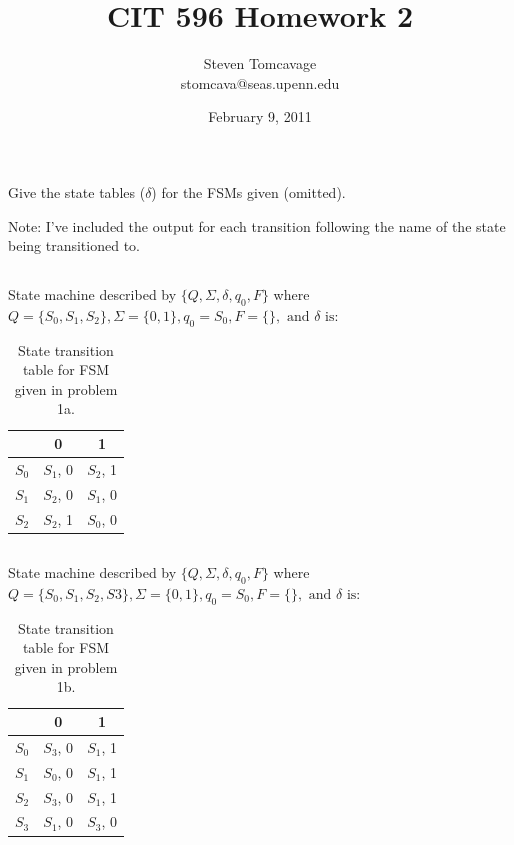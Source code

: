 \documentclass{article}
\title{CIT 596 Homework 2}
\author{Steven Tomcavage\\stomcava@seas.upenn.edu}
\date{February 9, 2011}
\begin{document}
\maketitle

\section{}

Give the state tables ($\delta$) for the FSMs given (omitted). 

Note: I've included the output for each transition following the name of the
state being transitioned to.

\subsection{}

State machine described by $\{Q, \Sigma, \delta, q_0, F\}$ where $Q = \{S_0,
S_1, S_2\}, \Sigma = \{0, 1\}, q_0 = S_0, F = \{\}, \text{ and } \delta
\text{ is:}$

\begin{table}[h!]
	\centering
	\begin{tabular}{ l || c | c }
	      & 0        & 1 \\
	\hline      
	$S_0$ & $S_1$, 0 & $S_2$, 1  \\
	$S_1$ & $S_2$, 0 & $S_1$, 0  \\
	$S_2$ & $S_2$, 1 & $S_0$, 0  \\
	\end{tabular}
	\caption{State transition table for FSM given in problem 1a.}
	\label{table_1a}
\end{table}

\subsection{}

State machine described by $\{Q, \Sigma, \delta, q_0, F\}$ where $Q = \{S_0,
S_1, S_2, S3\}, \Sigma = \{0, 1\}, q_0 = S_0, F = \{\}, \text{ and } \delta
\text{ is:}$

\begin{table}[h!]
	\centering
	\begin{tabular}{ l || c | c }
	      & 0        & 1 \\
	\hline      
	$S_0$ & $S_3$, 0 & $S_1$, 1  \\
	$S_1$ & $S_0$, 0 & $S_1$, 1  \\
	$S_2$ & $S_3$, 0 & $S_1$, 1  \\
	$S_3$ & $S_1$, 0 & $S_3$, 0  \\
	\end{tabular}
	\caption{State transition table for FSM given in problem 1b.}
	\label{table_1b}
\end{table}
\end{document}
